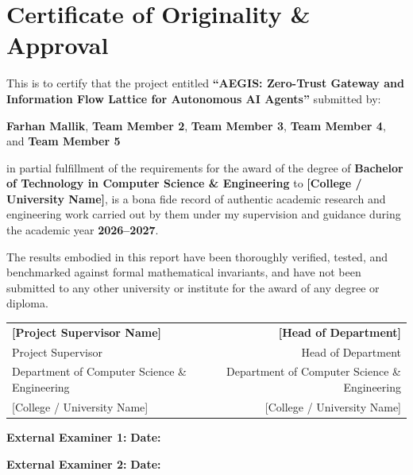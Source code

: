 \chapter*{Certificate of Originality \& Approval}

\vspace{0.8cm}

This is to certify that the project entitled \textbf{``AEGIS: Zero-Trust Gateway and Information Flow Lattice for Autonomous AI Agents''} submitted by:
\begin{center}
\textbf{Farhan Mallik}, \textbf{Team Member 2}, \textbf{Team Member 3}, \textbf{Team Member 4}, and \textbf{Team Member 5}
\end{center}
in partial fulfillment of the requirements for the award of the degree of \textbf{Bachelor of Technology in Computer Science \& Engineering} to \textbf{[College / University Name]}, is a bona fide record of authentic academic research and engineering work carried out by them under my supervision and guidance during the academic year \textbf{2026--2027}.

\vspace{0.5cm}

The results embodied in this report have been thoroughly verified, tested, and benchmarked against formal mathematical invariants, and have not been submitted to any other university or institute for the award of any degree or diploma.

\vspace{3.0cm}

\noindent
\begin{tabular*}{\textwidth}{@{\extracolsep{\fill}}lr}
\textbf{[Project Supervisor Name]} & \textbf{[Head of Department]} \\
Project Supervisor & Head of Department \\
Department of Computer Science \& Engineering & Department of Computer Science \& Engineering \\
{[College / University Name]} & {[College / University Name]} \\
\end{tabular*}

\vspace{2.0cm}

\noindent
\textbf{External Examiner 1:} \underline{\hspace{5cm}} \hfill \textbf{Date:} \underline{\hspace{3cm}} \\

\vspace{0.5cm}

\noindent
\textbf{External Examiner 2:} \underline{\hspace{5cm}} \hfill \textbf{Date:} \underline{\hspace{3cm}}

\newpage
